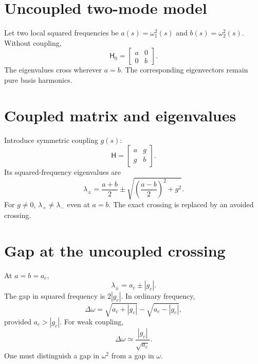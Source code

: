 \documentclass[11pt]{article}
\begin{document}
\section{Uncoupled two-mode model}

Let two local squared frequencies be $a(s)=\omega_1^2(s)$ and $b(s)=\omega_2^2(s)$. Without coupling,
\begin{equation}
\mathsf H_0=
\begin{bmatrix}
a&0\\
0&b
\end{bmatrix}.
\end{equation}
The eigenvalues cross wherever $a=b$. The corresponding eigenvectors remain pure basis harmonics.


\section{Coupled matrix and eigenvalues}

Introduce symmetric coupling $g(s)$:
\begin{equation}
\mathsf H=
\begin{bmatrix}
a&g\\
g&b
\end{bmatrix}.
\end{equation}
Its squared-frequency eigenvalues are
\begin{equation}
\boxed{\lambda_\pm=
\frac{a+b}{2}\pm
\sqrt{\left(\frac{a-b}{2}\right)^2+g^2}}.
\end{equation}
For $g\ne0$, $\lambda_+\ne\lambda_-$ even at $a=b$. The exact crossing is replaced by an avoided crossing.


\section{Gap at the uncoupled crossing}

At $a=b=a_c$,
\begin{equation}
\lambda_\pm=a_c\pm|g_c|.
\end{equation}
The gap in squared frequency is $2|g_c|$. In ordinary frequency,
\begin{equation}
\Delta\omega=
\sqrt{a_c+|g_c|}-\sqrt{a_c-|g_c|},
\end{equation}
provided $a_c>|g_c|$. For weak coupling,
\begin{equation}
\Delta\omega\simeq\frac{|g_c|}{\sqrt{a_c}}.
\end{equation}
One must distinguish a gap in $\omega^2$ from a gap in $\omega$.
\end{document}
